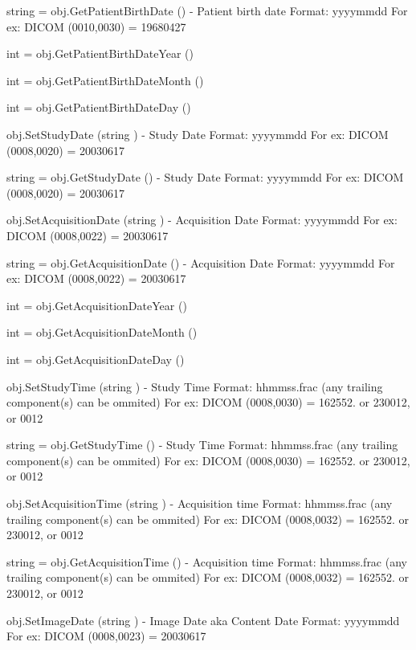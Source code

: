 \begin{DoxyItemize}
\item {\ttfamily string = obj.\-Get\-Patient\-Birth\-Date ()} -\/ Patient birth date Format\-: yyyymmdd For ex\-: D\-I\-C\-O\-M (0010,0030) = 19680427  
\item {\ttfamily int = obj.\-Get\-Patient\-Birth\-Date\-Year ()}  
\item {\ttfamily int = obj.\-Get\-Patient\-Birth\-Date\-Month ()}  
\item {\ttfamily int = obj.\-Get\-Patient\-Birth\-Date\-Day ()}  
\item {\ttfamily obj.\-Set\-Study\-Date (string )} -\/ Study Date Format\-: yyyymmdd For ex\-: D\-I\-C\-O\-M (0008,0020) = 20030617  
\item {\ttfamily string = obj.\-Get\-Study\-Date ()} -\/ Study Date Format\-: yyyymmdd For ex\-: D\-I\-C\-O\-M (0008,0020) = 20030617  
\item {\ttfamily obj.\-Set\-Acquisition\-Date (string )} -\/ Acquisition Date Format\-: yyyymmdd For ex\-: D\-I\-C\-O\-M (0008,0022) = 20030617  
\item {\ttfamily string = obj.\-Get\-Acquisition\-Date ()} -\/ Acquisition Date Format\-: yyyymmdd For ex\-: D\-I\-C\-O\-M (0008,0022) = 20030617  
\item {\ttfamily int = obj.\-Get\-Acquisition\-Date\-Year ()}  
\item {\ttfamily int = obj.\-Get\-Acquisition\-Date\-Month ()}  
\item {\ttfamily int = obj.\-Get\-Acquisition\-Date\-Day ()}  
\item {\ttfamily obj.\-Set\-Study\-Time (string )} -\/ Study Time Format\-: hhmmss.\-frac (any trailing component(s) can be ommited) For ex\-: D\-I\-C\-O\-M (0008,0030) = 162552. or 230012, or 0012  
\item {\ttfamily string = obj.\-Get\-Study\-Time ()} -\/ Study Time Format\-: hhmmss.\-frac (any trailing component(s) can be ommited) For ex\-: D\-I\-C\-O\-M (0008,0030) = 162552. or 230012, or 0012  
\item {\ttfamily obj.\-Set\-Acquisition\-Time (string )} -\/ Acquisition time Format\-: hhmmss.\-frac (any trailing component(s) can be ommited) For ex\-: D\-I\-C\-O\-M (0008,0032) = 162552. or 230012, or 0012  
\item {\ttfamily string = obj.\-Get\-Acquisition\-Time ()} -\/ Acquisition time Format\-: hhmmss.\-frac (any trailing component(s) can be ommited) For ex\-: D\-I\-C\-O\-M (0008,0032) = 162552. or 230012, or 0012  
\item {\ttfamily obj.\-Set\-Image\-Date (string )} -\/ Image Date aka Content Date Format\-: yyyymmdd For ex\-: D\-I\-C\-O\-M (0008,0023) = 20030617  

\end{DoxyItemize}
